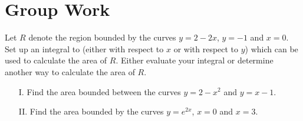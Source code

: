 \documentclass[handout]{ximera}
\begin{document}
\begin{problem}
\iffalse
\begin{image}
\begin{tikzpicture}
	\begin{axis}[
            domain=0:1.5, ymax=6,xmax=1.5,ymin=0, xmin=0,
            axis lines =left, xlabel=$x$, ylabel=$y$,
            xtick={0.5,1,2},
            every axis y label/.style={at=(current axis.above origin),anchor=south},
            every axis x label/.style={at=(current axis.right of origin),anchor=west},
            axis on top,
          ]
          \addplot [draw=none,fill=fillp,domain=0.5:1] {-3*x^2+4*x+3} \closedcycle;
          \addplot [draw=none,fill=background,domain=0.5:1] {3*x^2-3*x +2} \closedcycle;
          \addplot [draw=penColor,very thick] {-3*x^2+4*x+3};
          \addplot [draw=penColor2,very thick] {3*x^2-3*x +2};
          \node at (axis cs:0.75,4.75) [penColor] {$y= -3x^2+4x+3$};
          \node at (axis cs:0.75,0.75) [penColor2] {$y=3x^2-3x+2$};
        \end{axis}
\end{tikzpicture}
\end{image} 
\fi
\end{problem}

\begin{freeResponse} 
\end{freeResponse}


\section{Group Work}

\begin{problem}
Let $R$ denote the region bounded by the curves $y=2-2x$, $y=-1$ and $x=0$. Set up an integral to (either with respect to $x$ or with respect to $y$) which can be used to calculate the area of $R$. Either evaluate your integral or determine another way to calculate the area of $R$. 
\end{problem}

\begin{freeResponse}

\end{freeResponse}

\begin{problem}

\begin{enumerate}
\item[I.] Find the area bounded between the curves $y=2-x^2$ and $y=x-1$.

\item[II.] Find the area bounded by the curves $y=e^{2x}$, $x=0$ and $x=3$. 
\end{enumerate}
\end{problem}
\end{document}

